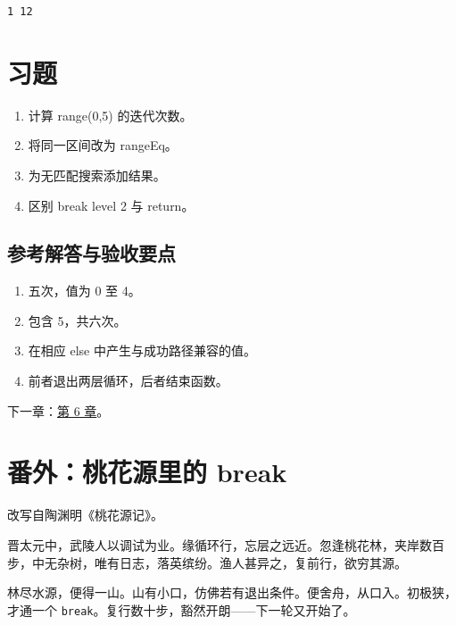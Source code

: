 \par
\medskip
\begin{lstlisting}[style=out]
1 12
\end{lstlisting}
\par
\medskip

\section{习题}

\begin{enumerate}

\item 计算 range(0,5) 的迭代次数。

\item 将同一区间改为 rangeEq。

\item 为无匹配搜索添加结果。

\item 区别 break level 2 与 return。

\end{enumerate}

\subsection*{参考解答与验收要点}

\begin{enumerate}

\item 五次，值为 0 至 4。

\item 包含 5，共六次。

\item 在相应 else 中产生与成功路径兼容的值。

\item 前者退出两层循环，后者结束函数。

\end{enumerate}

下一章：\hyperref[ch:06]{第 6 章}。

\section{番外：桃花源里的 break}

改写自陶渊明《桃花源记》。

晋太元中，武陵人以调试为业。缘循环行，忘层之远近。忽逢桃花林，夹岸数百步，中无杂树，唯有日志，落英缤纷。渔人甚异之，复前行，欲穷其源。

林尽水源，便得一山。山有小口，仿佛若有退出条件。便舍舟，从口入。初极狭，才通一个 \texttt{break}。复行数十步，豁然开朗——下一轮又开始了。


